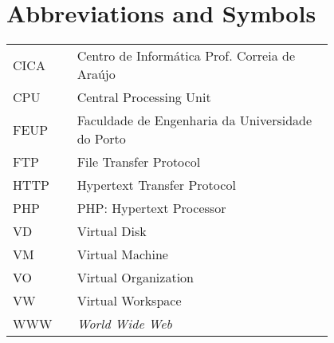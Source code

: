 \chapter*{Abbreviations and Symbols}

\begin{flushleft}
\begin{tabular}{l p{0.8\linewidth}}
CICA	 & Centro de Informática Prof. Correia de Araújo\\
CPU	 & Central Processing Unit\\
FEUP	 & Faculdade de Engenharia da Universidade do Porto\\
FTP	 & File Transfer Protocol\\
HTTP	 & Hypertext Transfer Protocol\\
PHP	 & PHP: Hypertext Processor\\
VD	 & Virtual Disk\\
VM	 & Virtual Machine\\
VO	 & Virtual Organization\\
VW	 & Virtual Workspace\\
WWW      & \emph{World Wide Web}
\end{tabular}
\end{flushleft}


